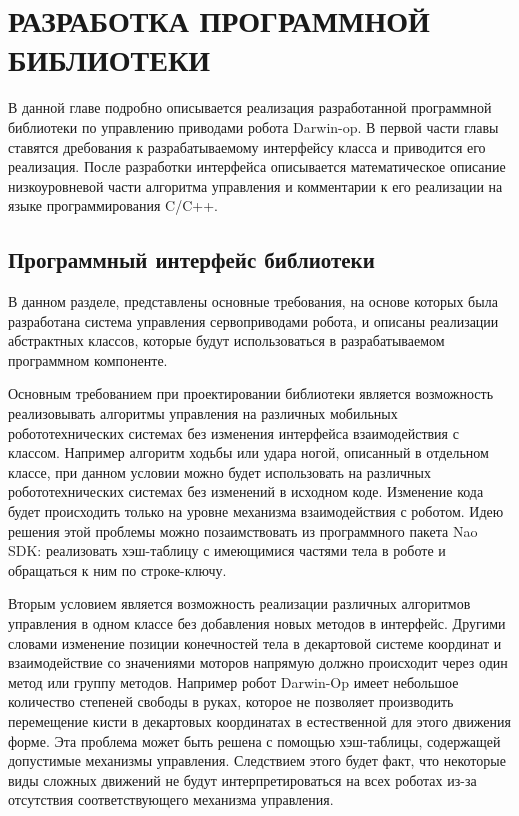 \chapter{РАЗРАБОТКА ПРОГРАММНОЙ БИБЛИОТЕКИ}

В данной главе подробно описывается реализация разработанной программной библиотеки по управлению приводами робота Darwin-op. В первой части главы ставятся дребования к разрабатываемому интерфейсу класса и приводится его реализация. После разработки интерфейса описывается математическое описание низкоуровневой части алгоритма управления и комментарии к его реализации на языке программирования C/C++.

\section{Программный интерфейс библиотеки}

В данном разделе, представлены основные требования, на основе которых была разработана система управления сервоприводами робота, и описаны реализации абстрактных классов, которые будут использоваться в разрабатываемом программном компоненте.

Основным требованием при проектировании библиотеки является возможность реализовывать алгоритмы управления на различных мобильных робототехнических системах без изменения интерфейса взаимодействия с классом. Например алгоритм ходьбы или удара ногой, описанный в отдельном классе, при данном условии можно будет использовать на различных робототехнических системах без изменений в исходном коде. Изменение кода будет происходить только на уровне механизма взаимодействия с роботом. Идею решения этой проблемы можно позаимствовать из программного пакета Nao SDK: реализовать хэш-таблицу с имеющимися частями тела в роботе и обращаться к ним по строке-ключу.

Вторым условием является возможность реализации различных алгоритмов управления в одном классе без добавления новых методов в интерфейс. Другими словами изменение позиции конечностей тела в декартовой системе координат и взаимодействие со значениями моторов напрямую должно происходит через один метод или группу методов. Например робот Darwin-Op имеет небольшое количество степеней свободы в руках, которое не позволяет производить перемещение кисти в декартовых координатах в естественной для этого движения форме. Эта проблема может быть решена с помощью хэш-таблицы, содержащей допустимые механизмы управления. Следствием этого будет факт, что некоторые виды сложных движений не будут интерпретироваться на всех роботах из-за отсутствия соответствующего механизма управления.

